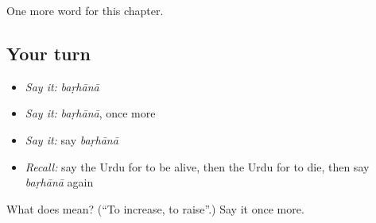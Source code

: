 \begin{grammarlens}[title={What you've built}]
One more word for this chapter.
\end{grammarlens}

\subsection*{Your turn}
\begin{itemize}
\raggedright
  \item \emph{Say it:} \emph{baṛhānā}
  \item \emph{Say it:} \emph{baṛhānā}, once more
  \item \emph{Say it:} say \emph{baṛhānā}
  \item \emph{Recall:} say the Urdu for to be alive, then the Urdu for to die, then say \emph{baṛhānā} again
\end{itemize}

\begin{tcolorbox}[breakable,colback=teal!4,colframe=teal!35!black,title={Before you move on}]
What does  mean? (\textquotedblleft{}To increase, to raise\textquotedblright{}.) Say it once more.
\end{tcolorbox}

